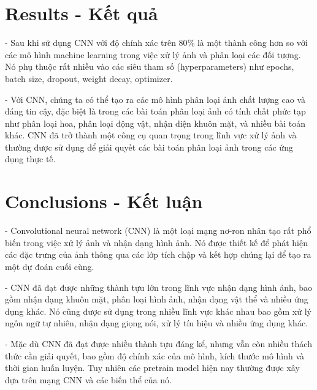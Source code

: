 \documentclass[12pt, a4paper]{article}
\begin{document}
\section{Results - Kết quả}
\par -  Sau khi sử dụng CNN với độ chính xác trên 80$\%$ là một thành công hơn so với các mô hình machine learning trong việc xử lý ảnh và phân loại các đối tượng. Nó phụ thuộc rất nhiều vào các siêu tham số (hyperparameters) như epochs, batch size, dropout, weight decay, optimizer. 
\par - Với CNN, chúng ta có thể tạo ra các mô hình phân loại ảnh chất lượng cao và đáng tin cậy, đặc biệt là trong các bài toán phân loại ảnh có tính chất phức tạp như phân loại hoa, phân loại động vật, nhận diện khuôn mặt, và nhiều bài toán khác. CNN đã trở thành một công cụ quan trọng trong lĩnh vực xử lý ảnh và thường được sử dụng để giải quyết các bài toán phân loại ảnh trong các ứng dụng thực tế.
\section{Conclusions - Kết luận}
\par - Convolutional neural network (CNN) là một loại mạng nơ-ron nhân tạo rất phổ biến trong việc xử lý ảnh và nhận dạng hình ảnh. Nó được thiết kế để phát hiện các đặc trưng của ảnh thông qua các lớp tích chập và kết hợp chúng lại để tạo ra một dự đoán cuối cùng.
\par - CNN đã đạt được những thành tựu lớn trong lĩnh vực nhận dạng hình ảnh, bao gồm nhận dạng khuôn mặt, phân loại hình ảnh, nhận dạng vật thể và nhiều ứng dụng khác. Nó cũng được sử dụng trong nhiều lĩnh vực khác nhau bao gồm xử lý ngôn ngữ tự nhiên, nhận dạng giọng nói, xử lý tín hiệu và nhiều ứng dụng khác.
\par - Mặc dù CNN đã đạt được nhiều thành tựu đáng kể, nhưng vẫn còn nhiều thách thức cần giải quyết, bao gồm độ chính xác của mô hình, kích thước mô hình và thời gian huấn luyện. Tuy nhiên các pretrain model hiện nay thường được xây dựa trên mạng CNN và các biến thể của nó. 















\end{document}
